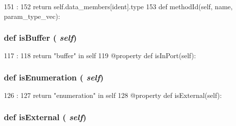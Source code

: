 \begin{DoxyCode}
151                                    :
152         return self.data_members[ident].type
153 
    def methodId(self, name, param_type_vec):
\end{DoxyCode}
\hypertarget{classslicc_1_1symbols_1_1Type_1_1Type_a83f4c7e23ed4de9a67fecb39999eeb80}{
\subsubsection[{isBuffer}]{\setlength{\rightskip}{0pt plus 5cm}def isBuffer ( {\em self})}}
\label{classslicc_1_1symbols_1_1Type_1_1Type_a83f4c7e23ed4de9a67fecb39999eeb80}



\begin{DoxyCode}
117                       :
118         return "buffer" in self
119     @property
    def isInPort(self):
\end{DoxyCode}
\hypertarget{classslicc_1_1symbols_1_1Type_1_1Type_aae5f64366a63e72db2c8f64804d9d48d}{
\subsubsection[{isEnumeration}]{\setlength{\rightskip}{0pt plus 5cm}def isEnumeration ( {\em self})}}
\label{classslicc_1_1symbols_1_1Type_1_1Type_aae5f64366a63e72db2c8f64804d9d48d}



\begin{DoxyCode}
126                            :
127         return "enumeration" in self
128     @property
    def isExternal(self):
\end{DoxyCode}
\hypertarget{classslicc_1_1symbols_1_1Type_1_1Type_acc588405cef959f9be9b93c1ec0f2bf6}{
\subsubsection[{isExternal}]{\setlength{\rightskip}{0pt plus 5cm}def isExternal ( {\em self})}}
\label{classslicc_1_1symbols_1_1Type_1_1Type_acc588405cef959f9be9b93c1ec0f2bf6}



